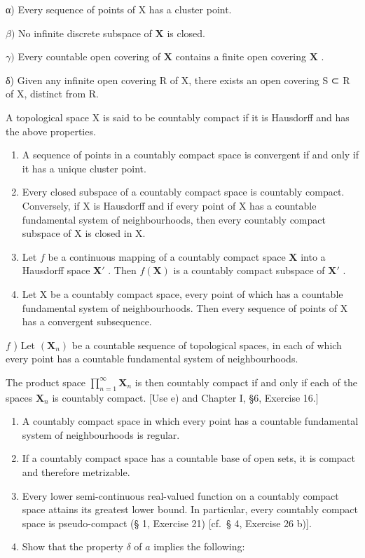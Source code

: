 α) Every sequence of points of X has a cluster point.

\(\beta)\) No infinite discrete subspace of \(\mathbf{X}\) is closed.

\(\gamma)\) Every countable open covering of \(\mathbf{X}\) contains a finite open covering \(\mathbf{X}\) .

δ) Given any infinite open covering R of X, there exists an open covering S ⊂ R of X, distinct from R.

A topological space X is said to be countably compact if it is Hausdorff and has the above properties.

\begin{enumerate}
\def\labelenumi{\alph{enumi})}
\setcounter{enumi}{1}
\item
  A sequence of points in a countably compact space is convergent if and only if it has a unique cluster point.
\item
  Every closed subspace of a countably compact space is countably compact. Conversely, if X is Hausdorff and if every point of X has a countable fundamental system of neighbourhoods, then every countably compact subspace of X is closed in X.
\item
  Let \(f\) be a continuous mapping of a countably compact space \(\mathbf{X}\) into a Hausdorff space \(\mathbf{X}'\) . Then \(f(\mathbf{X})\) is a countably compact subspace of \(\mathbf{X}'\) .
\item
  Let X be a countably compact space, every point of which has a countable fundamental system of neighbourhoods. Then every sequence of points of X has a convergent subsequence.
\end{enumerate}

\(f\) ) Let \((\mathbf{X}_n)\) be a countable sequence of topological spaces, in each of which every point has a countable fundamental system of neighbourhoods.

The product space \(\prod_{n=1}^{\infty} \mathbf{X}_n\) is then countably compact if and only if each of the spaces \(\mathbf{X}_n\) is countably compact. {[}Use e) and Chapter I, §6, Exercise 16.{]}

\begin{enumerate}
\def\labelenumi{\alph{enumi})}
\setcounter{enumi}{6}
\item
  A countably compact space in which every point has a countable fundamental system of neighbourhoods is regular.
\item
  If a countably compact space has a countable base of open sets, it is compact and therefore metrizable.
\item
  Every lower semi-continuous real-valued function on a countably compact space attains its greatest lower bound. In particular, every countably compact space is pseudo-compact (§ 1, Exercise 21) {[}cf.~§ 4, Exercise 26 b){]}.
\item
  Show that the property \(\delta\) of \(a\) implies the following:
\end{enumerate}

